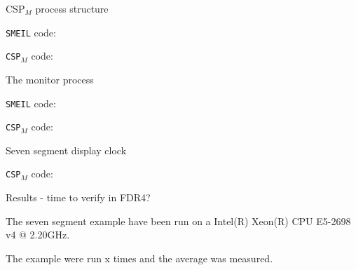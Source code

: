 \documentclass[13pt]{beamer}
\newcommand{\cspm}{CSP$_M$}
\begin{document}
%
\begin{frame}{\cspm{} process structure}
 \begin{block}{}
   \texttt{SMEIL} code:
     \vspace{5mm}

      \scalebox{0.8}{\usebox{\smeilprocessexample}}
 \end{block}
 \pause
 \begin{block}{}
    \texttt{\cspm{}} code:
      \vspace{5mm}

       \scalebox{0.8}{\usebox{\cspmprocessexample}}
 \end{block}

\end{frame}
%
\begin{frame}{The monitor process}
 \begin{block}{}
   \texttt{SMEIL} code:
     \vspace{5mm}

      \scalebox{0.8}{\usebox{\smeilchannelexample}}
 \end{block}
 \pause
 \begin{block}{}
    \texttt{\cspm{}} code:
      \vspace{5mm}

       \scalebox{0.8}{\usebox{\cspmmonitorexample}}
 \end{block}

\end{frame}
%
\begin{frame}{Seven segment display clock}
 \begin{block}{}
  \texttt{\cspm{}} code:
    \vspace{3mm}

     \scalebox{0.7}{\usebox{\cspmexample}}
 \end{block}
\end{frame}
%
\begin{frame}{Results - time to verify in FDR4?}
 \begin{block}{}
     The seven segment example have been run on a Intel(R) Xeon(R) CPU E5-2698 v4 @ 2.20GHz.

     \vspace{5mm}

   The example were run x times and the average was measured.
 \end{block}
\end{frame}
\end{document}
